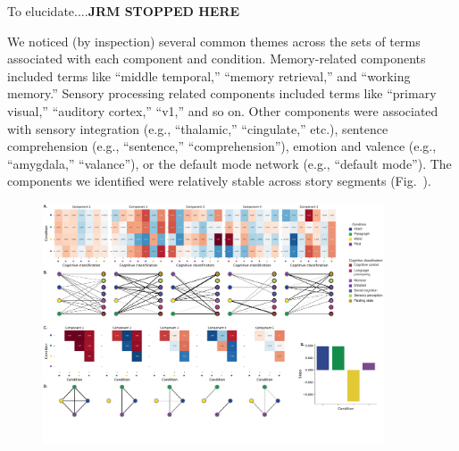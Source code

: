 \documentclass[english, 11pt]{article}
\begin{document}
To elucidate....\textbf{JRM STOPPED HERE}


We noticed (by
inspection) several common themes across the sets of terms associated with each
component and condition. Memory-related components included terms like ``middle
temporal,'' ``memory retrieval,'' and ``working memory.'' Sensory processing
related components included terms like ``primary visual,'' ``auditory cortex,''
``v1,'' and so on. Other components were associated with sensory integration
(e.g., ``thalamic,'' ``cingulate,'' etc.), sentence comprehension (e.g.,
``sentence,'' ``comprehension''), emotion and valence (e.g., ``amygdala,''
``valance''), or the default mode network (e.g., ``default mode''). The
components we identified were relatively stable across story segments
(Fig.~\synthThirds).

\begin{figure}[tp]
  \centering
  \includegraphics[width=0.9\textwidth]{figs/components_neurosynth_summary}


\end{figure}
\end{document}
